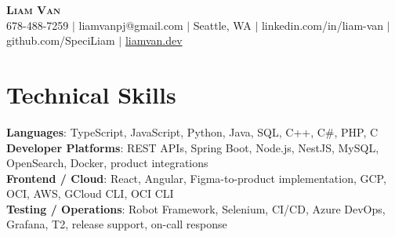 \documentclass[letterpaper,11pt]{article}
\begin{document}

%
\begin{center}
    \textbf{\Huge \scshape Liam Van} \\ \vspace{1pt}
    \small 678-488-7259 $|$ liamvanpj@gmail.com $|$ Seattle, WA $|$
    linkedin.com/in/liam-van $|$ github.com/SpeciLiam $|$ \href{https://liamvan.dev}{liamvan.dev}

\end{center}

\section{Technical Skills}
 \begin{itemize}[leftmargin=0.15in, label={}]
    \small{\item{
     \textbf{Languages}{: TypeScript, JavaScript, Python, Java, SQL, C++, C\#, PHP, C} \\
     \textbf{Developer Platforms}{: REST APIs, Spring Boot, Node.js, NestJS, MySQL, OpenSearch, Docker, product integrations} \\
     \textbf{Frontend / Cloud}{: React, Angular, Figma-to-product implementation, GCP, OCI, AWS, GCloud CLI, OCI CLI} \\
     \textbf{Testing / Operations}{: Robot Framework, Selenium, CI/CD, Azure DevOps, Grafana, T2, release support, on-call response} \\
    }}
 \end{itemize}
%

\end{document}
